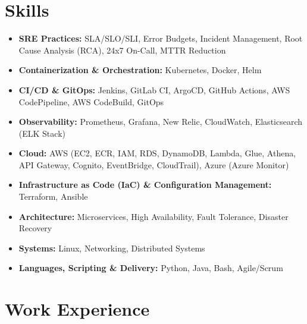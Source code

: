 \documentclass[a4paper,10.999999pt]{article}
\begin{document}
    \section{Skills}
    \begin{itemize}[leftmargin=1.35em, itemsep=0.35pt, topsep=0.3pt, parsep=0pt, label=\raisebox{0.25ex}{\tiny$\circ$}]
    \item \textbf{SRE Practices:} SLA/SLO/SLI, Error Budgets, Incident Management, Root Cause Analysis (RCA), 24x7 On-Call, MTTR Reduction
    \item \textbf{Containerization \& Orchestration:} Kubernetes, Docker, Helm
    \item \textbf{CI/CD \& GitOps:} Jenkins, GitLab CI, ArgoCD, GitHub Actions, AWS CodePipeline, AWS CodeBuild, GitOps
    \item \textbf{Observability:} Prometheus, Grafana, New Relic, CloudWatch, Elasticsearch (ELK Stack)
    \item \textbf{Cloud:} AWS (EC2, ECR, IAM, RDS, DynamoDB, Lambda, Glue, Athena, API Gateway, Cognito, EventBridge, CloudTrail), Azure (Azure Monitor)
    \item \textbf{Infrastructure as Code (IaC) \& Configuration Management:} Terraform, Ansible
    \item \textbf{Architecture:} Microservices, High Availability, Fault Tolerance, Disaster Recovery
    \item \textbf{Systems:} Linux, Networking, Distributed Systems
    \item \textbf{Languages, Scripting \& Delivery:} Python, Java, Bash, Agile/Scrum
    \end{itemize}


    \section{Work Experience}
\end{document}
